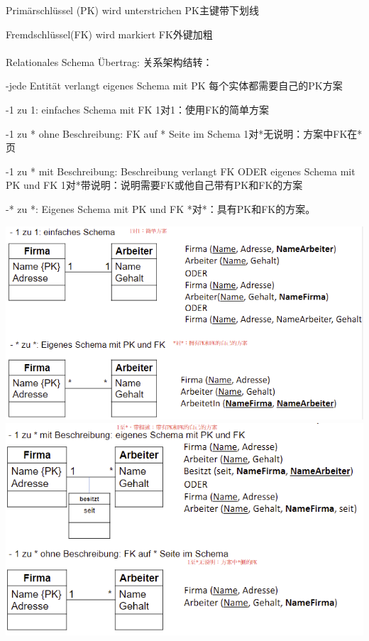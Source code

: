 \documentclass[fleqn]{article}
\begin{document}
\noindent Primärschlüssel (PK) wird unterstrichen PK主键带下划线

\noindent Fremdschlüssel(FK) wird markiert FK外键加粗
\\
\\
\noindent Relationales Schema Übertrag: 关系架构结转：

-jede Entität verlangt eigenes Schema mit PK 每个实体都需要自己的PK方案

-1 zu 1: einfaches Schema mit FK 1对1：使用FK的简单方案

-1 zu * ohne Beschreibung: FK auf * Seite im Schema 1对*无说明：方案中FK在*页

-1 zu * mit Beschreibung: Beschreibung verlangt FK ODER eigenes Schema mit PK und FK 1对*带说明：说明需要FK或他自己带有PK和FK的方案

-* zu *: Eigenes Schema mit PK und FK *对*：具有PK和FK的方案。

\begin{center} 
    \includegraphics[scale=0.5]{5.png}
    \includegraphics[scale=0.5]{6.png}
\end{center}
\end{document}
